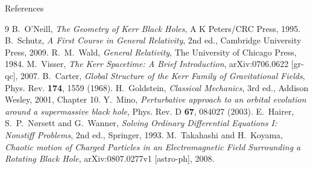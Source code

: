 \documentclass{beamer}
\begin{document}
\begin{frame}{References}
  \footnotesize
  \begin{thebibliography}{9}
      B.~O'Neill, 
      \emph{The Geometry of Kerr Black Holes},
      A K Peters/CRC Press, 1995.
      B.~Schutz,
      \emph{A First Course in General Relativity},
      2nd ed., Cambridge University Press, 2009.
      R.~M.~Wald,
      \emph{General Relativity},
      The University of Chicago Press, 1984.
      M.~Visser,
      \emph{The Kerr Spacetime: A Brief Introduction},
      arXiv:0706.0622 [gr-qc], 2007.
      B.~Carter,
      \emph{Global Structure of the Kerr Family of Gravitational Fields},
      Phys. Rev. \textbf{174}, 1559 (1968).
      H.~Goldstein,
      \emph{Classical Mechanics}, 3rd ed.,
      Addison Wesley, 2001, Chapter 10.
      Y.~Mino,
      \emph{Perturbative approach to an orbital evolution around a supermassive black hole},
      Phys. Rev. D \textbf{67}, 084027 (2003).
      E.~Hairer, S.~P.~N{\o}rsett and G.~Wanner,
      \emph{Solving Ordinary Differential Equations I: Nonstiff Problems}, 2nd ed., Springer, 1993.
      M.~Takahashi and H.~Koyama,
      \emph{Chaotic motion of Charged Particles in an Electromagnetic Field Surrounding a Rotating Black Hole},
      arXiv:0807.0277v1 [astro-ph], 2008.
  \end{thebibliography}
\end{frame}
\end{document}
